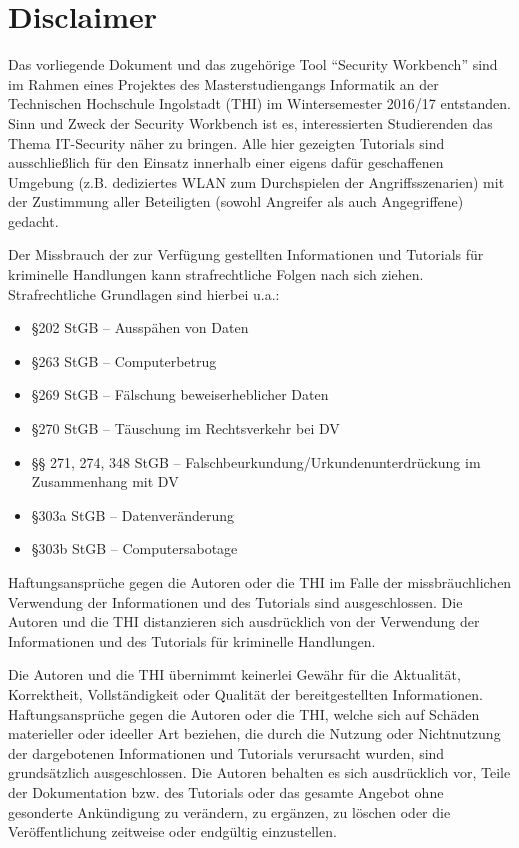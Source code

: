 \chapter{Disclaimer}
\label{ch:disclaimer}

Das vorliegende Dokument und das zugehörige Tool \enquote{Security Workbench} sind im Rahmen eines Projektes des Masterstudiengangs Informatik an der Technischen Hochschule Ingolstadt (THI) im Wintersemester 2016/17 entstanden. Sinn und Zweck der Security Workbench ist es, interessierten Studierenden das Thema IT-Security näher zu bringen. Alle hier gezeigten Tutorials sind ausschließlich für den Einsatz innerhalb einer eigens dafür geschaffenen Umgebung (z.B. dediziertes WLAN zum Durchspielen der Angriffsszenarien) mit der Zustimmung aller Beteiligten (sowohl Angreifer als auch Angegriffene) gedacht.

Der Missbrauch der zur Verfügung gestellten Informationen und Tutorials für kriminelle Handlungen kann strafrechtliche Folgen nach sich ziehen. Strafrechtliche Grundlagen sind hierbei u.a.:
\begin{itemize}
	\item§202 StGB – Ausspähen von Daten
	\item§263 StGB – Computerbetrug
	\item§269 StGB – Fälschung beweiserheblicher Daten
	\item§270 StGB – Täuschung im Rechtsverkehr bei DV
	\item§§ 271, 274, 348 StGB – Falschbeurkundung/Urkundenunterdrückung im Zusammenhang mit DV
	\item§303a StGB – Datenveränderung
	\item§303b StGB – Computersabotage
\end{itemize}

Haftungsansprüche gegen die Autoren oder die THI im Falle der missbräuchlichen Verwendung der Informationen und des Tutorials sind ausgeschlossen. Die Autoren und die THI distanzieren sich ausdrücklich von der Verwendung der Informationen und des Tutorials für kriminelle Handlungen.

Die Autoren und die THI übernimmt keinerlei Gewähr für die Aktualität, Korrektheit, Vollständigkeit oder Qualität der bereitgestellten Informationen. Haftungsansprüche gegen die Autoren oder die THI, welche sich auf Schäden materieller oder ideeller Art beziehen, die durch die Nutzung oder Nichtnutzung der dargebotenen Informationen und Tutorials verursacht wurden, sind grundsätzlich ausgeschlossen. Die Autoren behalten es sich ausdrücklich vor, Teile der Dokumentation bzw. des Tutorials oder das gesamte Angebot ohne gesonderte Ankündigung zu verändern, zu ergänzen, zu löschen oder die Veröffentlichung zeitweise oder endgültig einzustellen.

